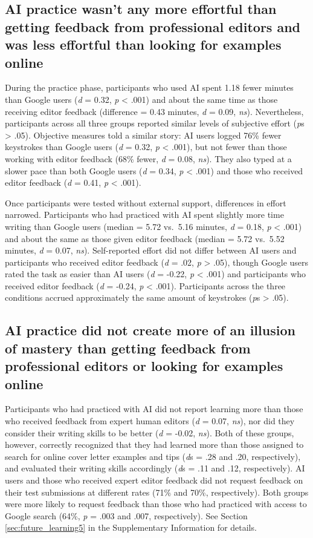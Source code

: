 \documentclass[11pt]{report}
\begin{document}
\begin{mainf}
\subsection*{AI practice wasn't any more effortful than getting feedback from professional editors and was less effortful than looking for examples online}

During the practice phase, participants who used AI spent 1.18 fewer minutes than Google users (\emph{d} = 0.32, \emph{p} < .001) and about the same time as those receiving editor feedback (difference = 0.43 minutes, \emph{d} = 0.09, \emph{ns}). Nevertheless, participants across all three groups reported similar levels of subjective effort (\emph{p}s > .05). Objective measures told a similar story: AI users logged 76\% fewer keystrokes than Google users (\emph{d} = 0.32, \emph{p} < .001), but not fewer than those working with editor feedback (68\% fewer, \emph{d} = 0.08, \emph{ns}). They also typed at a slower pace than both Google users (\emph{d} = 0.34, \emph{p} < .001) and those who received editor feedback (\emph{d} = 0.41, \emph{p} < .001).

Once participants were tested without external support, differences in effort narrowed. Participants who had practiced with AI spent slightly more time writing than Google users (median = 5.72 vs.\ 5.16 minutes, \emph{d} = 0.18, \emph{p} < .001) and about the same as those given editor feedback (median = 5.72 vs.\ 5.52 minutes, \emph{d} = 0.07, \emph{ns}). Self-reported effort did not differ between AI users and participants who received editor feedback (\textit{d} = .02, \emph{p} > .05), though Google users rated the task as easier than AI users (\emph{d} = -0.22, \emph{p} < .001) and participants who received editor feedback (\emph{d} = -0.24, \emph{p} < .001). Participants across the three conditions accrued approximately the same amount of keystrokes (\emph{p}s > .05).

\subsection*{AI practice did not create more of an illusion of mastery than getting feedback from professional editors or looking for examples online}

Participants who had practiced with AI did not report learning more than those who received feedback from expert human editors (\textit{d} = 0.07, \textit{ns}), nor did they consider their writing skills to be better (\textit{d} = -0.02, \textit{ns}). Both of these groups, however, correctly recognized that they had learned more than those assigned to search for online cover letter examples and tips (\textit{d}s = .28 and .20, respectively), and evaluated their writing skills accordingly (\textit{d}s = .11 and .12, respectively). AI users and those who received expert editor feedback did not request feedback on their test submissions at different rates (71\% and 70\%, respectively). Both groups were more likely to request feedback than those who had practiced with access to Google search (64\%, \textit{p} = .003 and .007, respectively). See Section \ref{sec:future_learning5} in the Supplementary Information for details.


\end{mainf}
\end{document}
